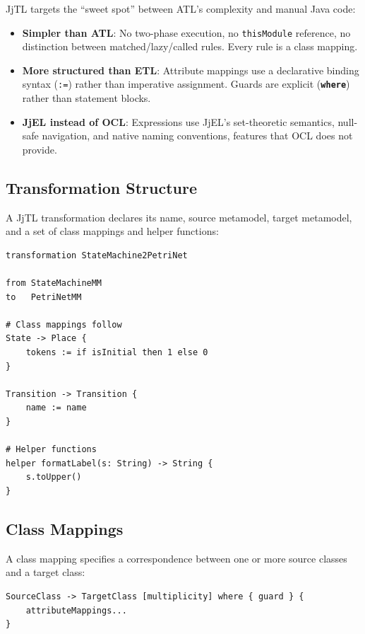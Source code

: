 \documentclass[11pt,a4paper]{article}
\newcommand{\jjel}{\textsf{JjEL}}
\newcommand{\jjtl}{\textsf{JjTL}}
\newcommand{\kw}[1]{\texttt{\textbf{#1}}}
\begin{document}
\jjtl{} targets the ``sweet spot'' between ATL's complexity and manual Java code:

\begin{itemize}
    \item \textbf{Simpler than ATL}: No two-phase execution, no \texttt{thisModule} reference, no distinction between matched/lazy/called rules. Every rule is a class mapping.
    \item \textbf{More structured than ETL}: Attribute mappings use a declarative binding syntax (\texttt{:=}) rather than imperative assignment. Guards are explicit (\kw{where}) rather than statement blocks.
    \item \textbf{JjEL instead of OCL}: Expressions use \jjel{}'s set-theoretic semantics, null-safe navigation, and native naming conventions, features that OCL does not provide.
\end{itemize}

\subsection{Transformation Structure}

A \jjtl{} transformation declares its name, source metamodel, target metamodel, and a set of class mappings and helper functions:

\begin{lstlisting}[style=jjtl]
transformation StateMachine2PetriNet

from StateMachineMM
to   PetriNetMM

# Class mappings follow
State -> Place {
    tokens := if isInitial then 1 else 0
}

Transition -> Transition {
    name := name
}

# Helper functions
helper formatLabel(s: String) -> String {
    s.toUpper()
}
\end{lstlisting}


\subsection{Class Mappings}

A class mapping specifies a correspondence between one or more source classes and a target class:

\begin{lstlisting}[style=jjtl,numbers=none]
SourceClass -> TargetClass [multiplicity] where { guard } {
    attributeMappings...
}
\end{lstlisting}
\end{document}
